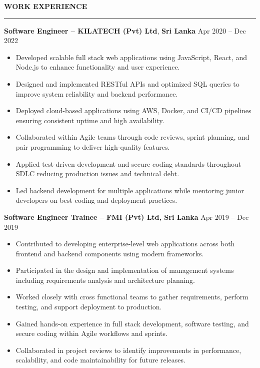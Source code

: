 \documentclass[10pt,letterpaper]{article}
\begin{document}
\vspace{8pt}

\textbf{WORK EXPERIENCE}\\[-8pt]
\noindent\rule{\textwidth}{1pt}

\vspace{-2pt}

\textbf{Software Engineer -- KILATECH (Pvt) Ltd}, \textbf{Sri Lanka} \hfill Apr 2020 -- Dec 2022

\vspace{-1pt}

\begin{itemize}
\item Developed scalable full stack web applications using JavaScript, React, and Node.js to enhance functionality and user experience.
\item Designed and implemented RESTful APIs and optimized SQL queries to improve system reliability and backend performance.
\item Deployed cloud-based applications using AWS, Docker, and CI/CD pipelines ensuring consistent uptime and high availability.
\item Collaborated within Agile teams through code reviews, sprint planning, and pair programming to deliver high-quality features.
\item Applied test-driven development and secure coding standards throughout SDLC reducing production issues and technical debt.
\item Led backend development for multiple applications while mentoring junior developers on best coding and deployment practices.
\end{itemize}

\textbf{Software Engineer Trainee -- FMI (Pvt) Ltd, Sri Lanka} \hfill Apr 2019 -- Dec 2019

\vspace{-1pt}

\begin{itemize}
\item Contributed to developing enterprise-level web applications across both frontend and backend components using modern frameworks.
\item Participated in the design and implementation of management systems including requirements analysis and architecture planning.
\item Worked closely with cross functional teams to gather requirements, perform testing, and support deployment to production.
\item Gained hands-on experience in full stack development, software testing, and secure coding within Agile workflows and sprints.
\item Collaborated in project reviews to identify improvements in performance, scalability, and code maintainability for future releases.
\end{itemize}
\end{document}
